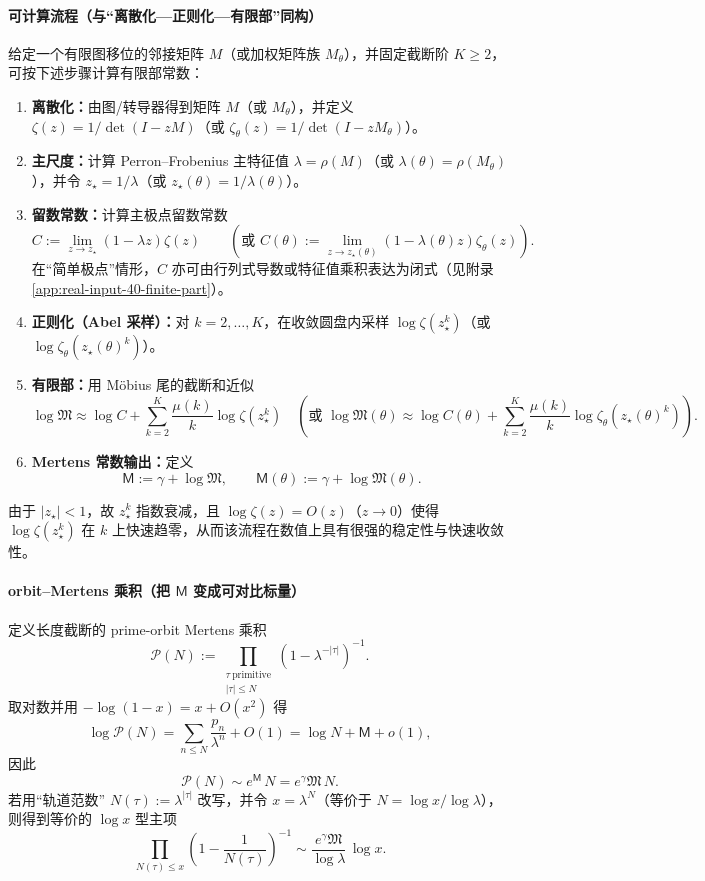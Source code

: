 \paragraph{可计算流程（与“离散化—正则化—有限部”同构）}
给定一个有限图移位的邻接矩阵 $M$（或加权矩阵族 $M_\theta$），并固定截断阶 $K\ge 2$，可按下述步骤计算有限部常数：
\begin{enumerate}
  \item \textbf{离散化：}由图/转导器得到矩阵 $M$（或 $M_\theta$），并定义 $\zeta(z)=1/\det(I-zM)$（或 $\zeta_\theta(z)=1/\det(I-zM_\theta)$）。
  \item \textbf{主尺度：}计算 Perron--Frobenius 主特征值 $\lambda=\rho(M)$（或 $\lambda(\theta)=\rho(M_\theta)$），并令 $z_\star=1/\lambda$（或 $z_\star(\theta)=1/\lambda(\theta)$）。
  \item \textbf{留数常数：}计算主极点留数常数
  \[
  C:=\lim_{z\to z_\star}(1-\lambda z)\zeta(z)
  \qquad
  (\text{或 }C(\theta):=\lim_{z\to z_\star(\theta)}(1-\lambda(\theta)z)\zeta_\theta(z)).
  \]
  在“简单极点”情形，$C$ 亦可由行列式导数或特征值乘积表达为闭式（见附录 \ref{app:real-input-40-finite-part}）。
  \item \textbf{正则化（Abel 采样）：}对 $k=2,\dots,K$，在收敛圆盘内采样 $\log\zeta(z_\star^k)$（或 $\log\zeta_\theta(z_\star(\theta)^k)$）。
  \item \textbf{有限部：}用 Möbius 尾的截断和近似
  \[
  \log\mathfrak{M}\approx \log C+\sum_{k=2}^{K}\frac{\mu(k)}{k}\log\zeta(z_\star^k)
  \quad
  (\text{或 }\log\mathfrak{M}(\theta)\approx \log C(\theta)+\sum_{k=2}^{K}\frac{\mu(k)}{k}\log\zeta_\theta(z_\star(\theta)^k)).
  \]
  \item \textbf{Mertens 常数输出：}定义
  \[
  \mathsf{M}:=\gamma+\log\mathfrak{M},
  \qquad
  \mathsf{M}(\theta):=\gamma+\log\mathfrak{M}(\theta).
  \]
\end{enumerate}
由于 $|z_\star|<1$，故 $z_\star^k$ 指数衰减，且 $\log\zeta(z)=O(z)$（$z\to 0$）使得 $\log\zeta(z_\star^k)$ 在 $k$ 上快速趋零，从而该流程在数值上具有很强的稳定性与快速收敛性。

\paragraph{orbit--Mertens 乘积（把 $\mathsf{M}$ 变成可对比标量）}
定义长度截断的 prime-orbit Mertens 乘积
\[
\mathcal{P}(N):=\prod_{\substack{\tau\ \mathrm{primitive}\\|\tau|\le N}}\left(1-\lambda^{-|\tau|}\right)^{-1}.
\]
取对数并用 $-\log(1-x)=x+O(x^2)$ 得
\[
\log\mathcal{P}(N)=\sum_{n\le N}\frac{p_n}{\lambda^n}+O(1)
=\log N+\mathsf{M}+o(1),
\]
因此
\[
\mathcal{P}(N)\sim e^{\mathsf{M}}\,N=e^{\gamma}\mathfrak{M}\,N.
\]
若用“轨道范数” $N(\tau):=\lambda^{|\tau|}$ 改写，并令 $x=\lambda^N$（等价于 $N=\log x/\log\lambda$），则得到等价的 $\log x$ 型主项
\[
\prod_{N(\tau)\le x}\left(1-\frac{1}{N(\tau)}\right)^{-1}
\sim \frac{e^{\gamma}\mathfrak{M}}{\log\lambda}\,\log x.
\]

